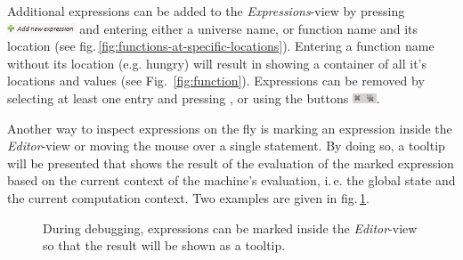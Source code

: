 \documentclass[10pt,oneside,a4paper]{article}
\begin{document}
Additional expressions can be added to the \emph{Expressions}-view by pressing \includegraphics[height=0.8em]{images/add-new-expression.png} and entering either a universe name, or function name and its location (see fig.\,\ref{fig:functions-at-specific-locations}). Entering a function name without its location (e.g. hungry) will result in showing a container of all it's locations and values (see Fig.~\ref{fig:function}).
Expressions can be removed by selecting at least one entry and pressing \keys{\del}, or using the buttons \includegraphics[height=0.8em]{images/expression-remove.png}.


Another way to inspect expressions on the fly is marking an expression inside the \emph{Editor}-view or moving the mouse over a single statement. By doing so, a tooltip will be presented that shows the result of the evaluation of the marked expression based on the current context of the machine's evaluation, i.\,e. the global state and the current computation context. Two examples are given in fig.\,\ref{fig:on-the-fly}.

\begin{figure}[h]
\centering
	\quad

	\caption{During debugging, expressions can be marked inside the \emph{Editor}-view so that the result will be shown as a tooltip.}
	\label{fig:on-the-fly}
\end{figure}
\end{document}
